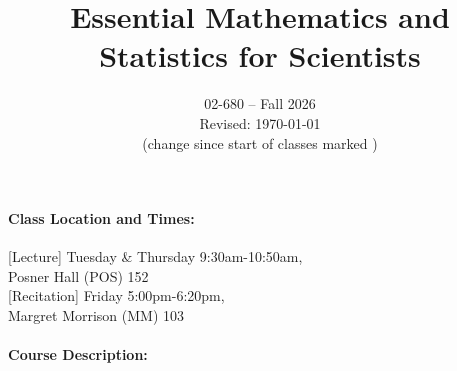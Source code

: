 \documentclass[12pt]{scrartcl}
\title{\large Essential Mathematics and Statistics for Scientists}\let\Title\@title
\subtitle{
\vskip-1cm}
\date{\large 02-680 -- Fall 2026\\ \vspace{1em}\small Revised: \today\\(change since start of classes marked \change{}{in orange})}
\author{}
\begin{document}

\maketitle





\paragraph{Class Location and Times:\\} 
\hspace*{2em}[Lecture] \hspace{1.1em}Tuesday \& Thursday 9:30am-10:50am, \\ 
\hspace*{8em} Posner Hall (POS) 152 \vspace*{0.5em}\\
\hspace*{3em}[Recitation] Friday 5:00pm-6:20pm, \\ \hspace*{8em} Margret Morrison (MM) 103



\paragraph{Course Description:} 
\end{document}
